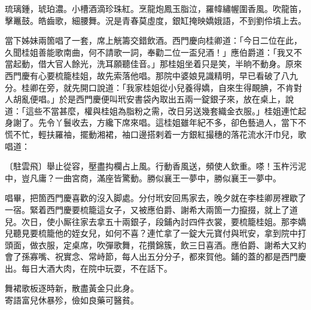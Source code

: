 \begin{myquote}
琉璃鍾，琥珀濃。小槽酒滴珍珠紅。烹龍炮鳳玉脂泣，羅幃繡幄圍香風。吹龍笛，擊鼉鼓。皓齒歌，細腰舞。況是青春莫虛度，銀缸掩映嬌娥語，不到劉伶墳上去。
\end{myquote}

當下姊妹兩箇唱了一套，席上觥籌交錯飲酒。西門慶向桂卿道：「今日二位在此，久聞桂姐善能歌南曲，何不請歌一詞，奉勸二位一盃兒酒！」應伯爵道：「我又不當起動，借大官人餘光，洗耳願聽佳音。」那桂姐坐着只是笑，半晌不動身。原來西門慶有心要梳籠桂姐，故先索落他唱。那院中婆娘見識精明，早已看破了八九分。桂卿在旁，就先開口說道：「我家桂姐從小兒養得嬌，自來生得靦腆，不肯對人胡亂便唱。」於是西門慶便叫玳安書袋內取出五兩一錠銀子來，放在桌上，說道：「這些不當甚麼，權與桂姐為脂粉之需，改日另送幾套織金衣服。」桂姐連忙起身謝了。{}先令丫鬟收去，方纔下席來唱。這桂姐雖年紀不多，卻色藝過人，當下不慌不忙，輕扶羅袖，擺動湘裙，袖口邊搭剌着一方銀紅撮穗的落花流水汗巾兒，{}歌唱道：

\begin{myquote}
{\markfont\small〔駐雲飛〕}舉止從容，壓盡抅欄占上風。行動香風送，頻使人欽重。嗏！玉杵污泥中，豈凡庸？一曲宮商，滿座皆驚動。勝似襄王一夢中，勝似襄王一夢中。
\end{myquote}

唱畢，把箇西門慶喜歡的沒入脚處。分付玳安回馬家去，晚夕就在李桂卿房裡歇了一宿。緊着西門慶要梳籠這女子，又被應伯爵、謝希大兩箇一力攛掇，就上了道兒。次日，使小厮往家去拿五十兩銀子，段鋪內討四件衣裳，要梳籠桂姐。那李嬌兒聽見要梳籠他的姪女兒，{}如何不喜？連忙拿了一錠大元寶付與玳安，拿到院中打頭面，做衣服，定桌席，吹彈歌舞，花攢錦簇，飲三日喜酒。應伯爵、謝希大又約會了孫寡嘴、祝實念、常峙節，每人出五分分子，都來賀他。鋪的蓋的都是西門慶出。每日大酒大肉，在院中玩耍，不在話下。

\begin{myquote}
舞裙歌板逐時新，散盡黃金只此身。\\寄語富兒休暴殄，儉如良藥可醫貧。
\end{myquote}

